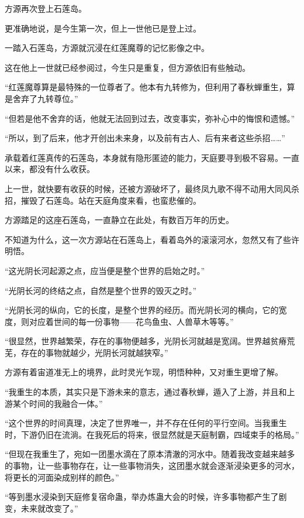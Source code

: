 
\begin{this_body}

方源再次登上石莲岛。

更准确地说，是今生第一次，但上一世他已是登上过。

一踏入石莲岛，方源就沉浸在红莲魔尊的记忆影像之中。

这在他上一世就已经参阅过，今生只是重复，但方源依旧有些触动。

“红莲魔尊算是最特殊的一位尊者了。他本有九转修为，但利用了春秋蝉重生，算是舍弃了九转尊位。”

“但若是他不舍弃的话，他就无法回到过去，改变事实，弥补心中的悔恨和遗憾。”

“所以，到了后来，他才开创出未来身，以及前有古人、后有来者这些杀招……”

承载着红莲真传的石莲岛，本身就有隐形匿迹的能力，天庭要寻到极不容易。一直以来，都没有什么收获。

上一世，就快要有收获的时候，还被方源破坏了，最终凤九歌不得不动用大同风杀招，摧毁了石莲岛。站在天庭角度来看，也蛮悲催的。

方源踏足的这座石莲岛，一直静立在此处，有数百万年的历史。

不知道为什么，这一次方源站在石莲岛上，看着岛外的滚滚河水，忽然又有了些许明悟。

“这光阴长河起源之点，应当便是整个世界的启始之时。”

“光阴长河的终结之点，自然是整个世界的毁灭之时。”

“光阴长河的纵向，它的长度，是整个世界的经历。而光阴长河的横向，它的宽度，则对应着世间的每一份事物——花鸟鱼虫、人兽草木等等。”

“很显然，世界越繁荣，存在的事物便越多，光阴长河就越是宽阔。世界越贫瘠荒芜，存在的事物就越少，光阴长河就越狭窄。”

方源有着宙道准无上的境界，此时灵光乍现，明悟种种，又对重生更增了解。

“我重生的本质，其实只是下游未来的意志，通过春秋蝉，遁入了上游，并且和上游某个时间的我融合一体。”

“这个世界的时间真理，决定了世界唯一，并不存在任何的平行空间。当我重生时，下游仍旧在流淌。在我死后的将来，很显然就是天庭制霸，四域束手的格局。”

“但现在我重生了，宛如一团墨水滴在了原本清澈的河水中。随着我改变越来越多的事物，让一些事物存在，让一些事物消失，这团墨水就会逐渐浸染更多的河水，将更长的河面染成别样的颜色。”

“等到墨水浸染到天庭修复宿命蛊，举办炼蛊大会的时候，许多事物都产生了剧变，未来就改变了。”


\end{this_body}
